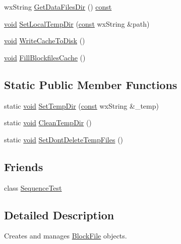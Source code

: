 \begin{DoxyCompactItemize}
\item 
wx\+String \hyperlink{class_dir_manager_ade16cfa4c78314d98b95afcb578e778d}{Get\+Data\+Files\+Dir} () \hyperlink{getopt1_8c_a2c212835823e3c54a8ab6d95c652660e}{const} 
\item 
\hyperlink{sound_8c_ae35f5844602719cf66324f4de2a658b3}{void} \hyperlink{class_dir_manager_a021b6a97e965725de56ddbb2ebd86858}{Set\+Local\+Temp\+Dir} (\hyperlink{getopt1_8c_a2c212835823e3c54a8ab6d95c652660e}{const} wx\+String \&path)
\item 
\hyperlink{sound_8c_ae35f5844602719cf66324f4de2a658b3}{void} \hyperlink{class_dir_manager_a60a2e50f029007aa4f0768b106f125c3}{Write\+Cache\+To\+Disk} ()
\item 
\hyperlink{sound_8c_ae35f5844602719cf66324f4de2a658b3}{void} \hyperlink{class_dir_manager_afb6192170ddb64f16a37e355ef36be68}{Fill\+Blockfiles\+Cache} ()
\end{DoxyCompactItemize}
\subsection*{Static Public Member Functions}
\begin{DoxyCompactItemize}
\item 
static \hyperlink{sound_8c_ae35f5844602719cf66324f4de2a658b3}{void} \hyperlink{class_dir_manager_aeaa74f74860153cd04044f5212d3da82}{Set\+Temp\+Dir} (\hyperlink{getopt1_8c_a2c212835823e3c54a8ab6d95c652660e}{const} wx\+String \&\+\_\+temp)
\item 
static \hyperlink{sound_8c_ae35f5844602719cf66324f4de2a658b3}{void} \hyperlink{class_dir_manager_aa13fcfcc42962abc7811af4e762434bc}{Clean\+Temp\+Dir} ()
\item 
static \hyperlink{sound_8c_ae35f5844602719cf66324f4de2a658b3}{void} \hyperlink{class_dir_manager_a560513b156de9ae75cdcf6e68ee29ea5}{Set\+Dont\+Delete\+Temp\+Files} ()
\end{DoxyCompactItemize}
\subsection*{Friends}
\begin{DoxyCompactItemize}
\item 
class \hyperlink{class_dir_manager_a81667f7d1cfd26791cb795fc88839fd2}{Sequence\+Test}
\end{DoxyCompactItemize}


\subsection{Detailed Description}
Creates and manages \hyperlink{class_block_file}{Block\+File} objects. 

